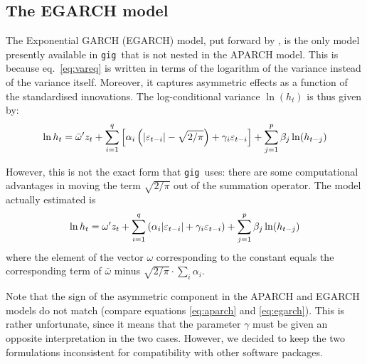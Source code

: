 \documentclass[a4paper,11pt]{article}
\newcommand{\stdu}{\ensuremath \varepsilon}
\newcommand{\uhat}{\ensuremath u}
\newcommand{\gig}{\texttt{gig}}
\begin{document}
\subsection{The EGARCH model}
\label{sec:EGARCH}

The Exponential GARCH (EGARCH) model, put forward by \cite{Nelson}, is
the only model presently available in \gig\ that is not nested
in the APARCH model. This is because eq.~\eqref{eq:vareq} is written
in terms of the logarithm of the variance instead of the variance
itself. Moreover, it captures asymmetric effects as a function of the
standardised innovations. The log-conditional variance $\ln(h_t)$ is
thus given by:
\begin{equation}\label{eq:egarch-0}
  \ln h_t = \bar{\omega}'z_t  + 
  \sum_{i=1}^q \left[
    \alpha_i \left( |\stdu_{t-i}| - \sqrt{2/\pi}\right) + \gamma_i \stdu_{t-i}
  \right]+
  \sum_{j=1}^p \beta_j \ln(h_{t-j})
\end{equation}

However, this is not the exact form that \gig\ uses: there are some
computational advantages in moving the term $\sqrt{2/\pi}$ out of the
summation operator. The model actually estimated is
\begin{equation}\label{eq:egarch}
  \ln h_t = \omega'z_t  + 
  \sum_{i=1}^q \left( \alpha_i |\stdu_{t-i}| + \gamma_i \stdu_{t-i} \right)+
  \sum_{j=1}^p \beta_j \ln(h_{t-j})
\end{equation}
where the element of the vector $\omega$ corresponding to the constant
equals the corresponding term of $\bar{\omega}$ minus $\sqrt{2/\pi}
\cdot \sum_{i} \alpha_i$.

Note that the sign of the asymmetric component in the APARCH and
EGARCH models do not match (compare equations \eqref{eq:aparch} and
\eqref{eq:egarch}). This is rather unfortunate, since it means that
the parameter $\gamma$ must be given an opposite interpretation in the
two cases. However, we decided to keep the two formulations
inconsistent for compatibility with other software packages.


\end{document}

